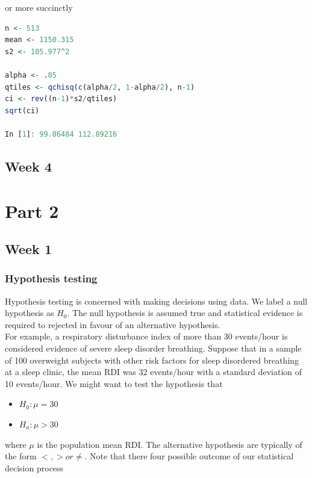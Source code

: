 \documentclass{homework}
\begin{document}
or more succinctly

\begin{lstlisting}[language=R]
n <- 513
mean <- 1150.315
s2 <- 105.977^2 

alpha <- .05 
qtiles <- qchisq(c(alpha/2, 1-alpha/2), n-1)
ci <- rev((n-1)*s2/qtiles)
sqrt(ci)

In [1]: 99.86484 112.89216
\end{lstlisting}

\subsection{Week 4}

\clearpage

\section{Part 2}
\subsection{Week 1}

\subsubsection{Hypothesis testing}

Hypothesis testing is concerned with making decisions using data. We label a null hypothesis as $H_0$. The null hypothesis is assumed true and statistical evidence is required to rejected in favour of an alternative hypothesis. \\

For example, a respiratory disturbance index of more than 30 events/hour is considered evidence of severe sleep disorder breathing. Suppose that in a sample of 100 overweight subjects with other risk factors for sleep disordered breathing at a sleep clinic, the mean RDI was 32 events/hour with a standard deviation of 10 events/hour. We might want to test the hypothesis that 

\begin{itemize}
    \item $H_0 : \mu = 30$ 
    \item $H_a : \mu > 30$ 
\end{itemize}

where $\mu$ is the population mean RDI. The alternative hypothesis are typically of the form $<,> or \neq$. Note that there four possible outcome of our statistical decision process\\
\end{document}
